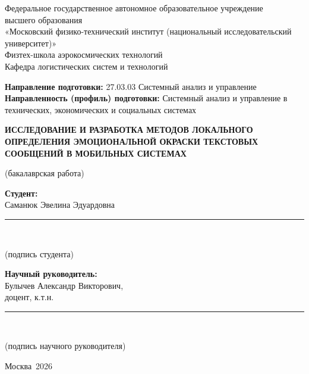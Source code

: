 \documentclass[12pt,a4paper]{report}
\newcommand{\miptSchool}{Физтех-школа аэрокосмических технологий}
\newcommand{\miptDepartment}{Кафедра логистических систем и технологий}
\newcommand{\miptProgram}{27.03.03 Системный анализ и управление}
\newcommand{\miptProfile}{Системный анализ и управление в технических, экономических и социальных системах}
\newcommand{\thesisTitle}{ИССЛЕДОВАНИЕ И РАЗРАБОТКА МЕТОДОВ ЛОКАЛЬНОГО ОПРЕДЕЛЕНИЯ ЭМОЦИОНАЛЬНОЙ ОКРАСКИ ТЕКСТОВЫХ СООБЩЕНИЙ В МОБИЛЬНЫХ СИСТЕМАХ}
\newcommand{\thesisType}{бакалаврская работа}
\newcommand{\studentName}{Саманюк Эвелина Эдуардовна}
\newcommand{\supervisorName}{Булычев Александр Викторович}
\newcommand{\thesisCity}{Москва}
\newcommand{\thesisYear}{2026}
\begin{document}
\begin{titlepage}
\thispagestyle{empty}
\begingroup
\setlength{\parindent}{0pt}
\renewcommand{\baselinestretch}{1}\selectfont



\vspace{1.4em}

\begin{center}


\vspace{0.7em}

Федеральное государственное автономное образовательное учреждение\\
высшего образования\\
«Московский физико-технический институт (национальный исследовательский университет)»\\
\miptSchool\\
\miptDepartment
\end{center}

\vspace{-0.3em}

\noindent\textbf{Направление подготовки:} \miptProgram\\
\textbf{Направленность (профиль) подготовки:} \miptProfile
\endgroup

\vfill

\begin{center}
{\bfseries\MakeUppercase{\thesisTitle}\par}
\vspace{1em}
(\thesisType)
\end{center}

\vfill

\hfill
\begin{minipage}{0.50\textwidth}
\textbf{Студент:}\\
\studentName\\
\rule{8cm}{0.4pt}\\
\centerline{\small (подпись студента)}

\vspace{1em}

\textbf{Научный руководитель:}\\
\supervisorName,\\
доцент, к.т.н.\\
\rule{8cm}{0.4pt}\\
\centerline{\small (подпись научного руководителя)}
\end{minipage}

\vfill

\begin{center}
\thesisCity\ \thesisYear
\end{center}
\end{titlepage}
\setcounter{page}{2}
\end{document}
